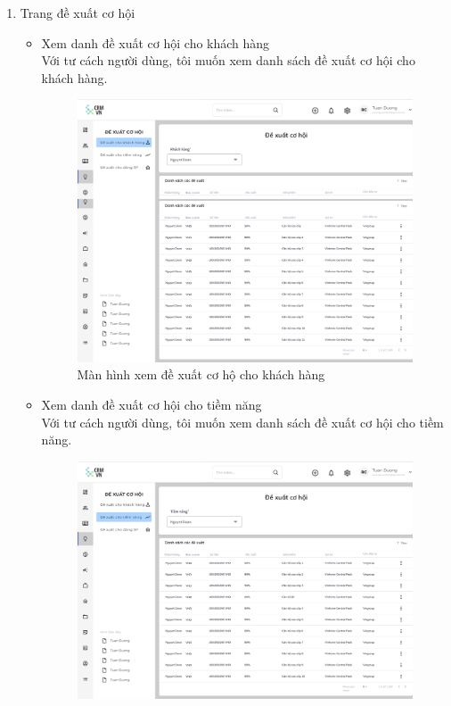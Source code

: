 \documentclass[12pt,a4paper]{article}
\begin{document}
\begin{enumerate}
        \item Trang đề xuất cơ hội
        \begin{itemize}
            \item Xem danh đề xuất cơ hội cho khách hàng \\
            Với tư cách người dùng, tôi muốn xem danh sách đề xuất cơ hội cho khách hàng.
            \begin{figure}[H]
                \centering \includegraphics[width=\textwidth]{Img/Nguyet/DexuatCohoi/danhsachdexuat.png}
                \vspace{0.5cm}
                \caption{Màn hình xem đề xuất cơ hộ cho khách hàng}
                \label{dexuatcohoiKH}
            \end{figure}
            \item Xem danh đề xuất cơ hội cho tiềm năng\\
            Với tư cách người dùng, tôi muốn xem danh sách đề xuất cơ hội cho tiềm năng.
            \begin{figure}[H]
                \centering \includegraphics[width=\textwidth]{Img/Nguyet/DexuatCohoi/dsdexuattiemnang.png}

\end{figure}
\end{itemize}
\end{enumerate}
\end{document}
